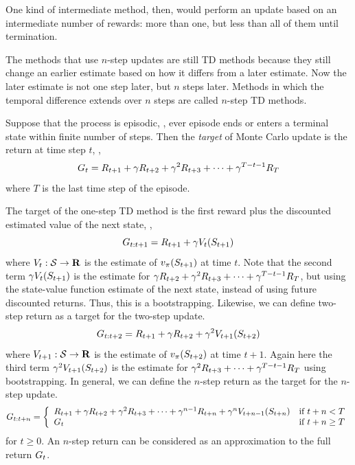 One kind of intermediate method, then, would perform an update based on an intermediate number of rewards:
more than one, but less than all of them until termination.

The methods that use $n$-step updates are still TD methods
because they still change an earlier estimate based on how it differs from a later estimate.
Now the later estimate is not one step later,
but $n$ steps later.
Methods in which the temporal difference extends over $n$ steps are called $n$-step TD methods.

Suppose that the process is episodic, \ie, ever episode ends or enters a terminal state within finite number of steps.
Then the \emph{target} of Monte Carlo update
is the return at time step $t$, \ie,
\begin{equation}
G_{{t}} = R_{t+1}
+ \gamma R_{t+2}
+ \gamma^2 R_{t+3}
+ \cdots
+ \gamma^{T-t-1} R_{T}
\end{equation}
where $T$ is the last time step of the episode.

The target of the one-step TD method is the first reward plus the discounted estimated value of the next state, \ie,
\begin{equation}
\label{eq:one-step-return}
G_{{t}:{t+1}} = R_{t+1} + \gamma V_t(S_{t+1})
\end{equation}
where $V_t:\mathcal{S}\to\mathbf{R}$ is the estimate of $v_{\pi}(S_{t+1})$ at time $t$.
Note that the second term $\gamma V_t(S_{t+1})$ is the estimate for $\gamma R_{t+2} + \gamma^2 R_{t+3} + \cdots + \gamma^{T-t-1} R_{T}$,
but using the state-value function estimate of the next state, instead of using future discounted returns.
Thus, this is a bootstrapping.
Likewise, we can define two-step return as a target for the two-step update.
\begin{equation}
\label{eq:two-step-return}
G_{{t}:{t+2}} = R_{t+1} + \gamma R_{t+2} + \gamma^2 V_{t+1}(S_{t+2})
\end{equation}
where $V_{t+1}:\mathcal{S}\to\mathbf{R}$ is the estimate of $v_{\pi}(S_{t+2})$ at time $t+1$.
Again here the third term $\gamma^2 V_{t+1}(S_{t+2})$ is the estimate for $\gamma^2 R_{t+3} + \cdots + \gamma^{T-t-1} R_{T}$
using bootstrapping.
In general, we can define the $n$-step return as the target for the $n$-step update.
\begin{equation}
\label{eq:n-step-return}
G_{{t}:{t+n}} = \left\{\begin{array}{ll}
R_{t+1} + \gamma R_{t+2} + \gamma^2 R_{t+3} + \cdots + \gamma^{n-1} R_{t+n} + \gamma^n V_{t+n-1}(S_{t+n})
&\mbox{if } t+n < T
\\
G_{{t}} & \mbox{if } t+n \geq T
\end{array}\right.
\end{equation}
for $t\geq0$.
An $n$-step return can be considered as an approximation to the full return $G_{{t}}$.

